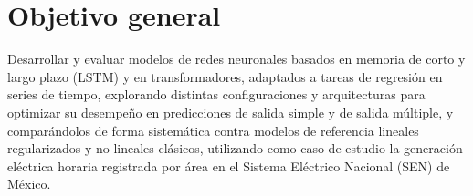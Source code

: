 \section{Objetivo general}

Desarrollar y evaluar modelos de redes neuronales basados en memoria de corto y largo plazo (LSTM) y en transformadores, adaptados a tareas de regresión en series de tiempo, explorando distintas configuraciones y arquitecturas para optimizar su desempeño en predicciones de salida simple y de salida múltiple, y comparándolos de forma sistemática contra modelos de referencia lineales regularizados y no lineales clásicos, utilizando como caso de estudio la generación eléctrica horaria registrada por área en el Sistema Eléctrico Nacional (SEN) de México.
